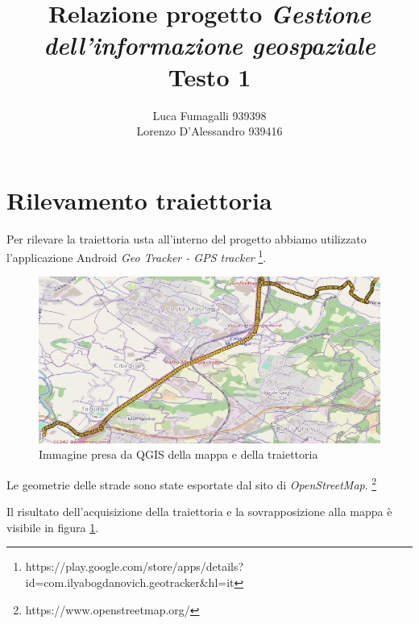 \documentclass[12pt]{report}
\begin{document}
	\author{Luca Fumagalli 939398\\ Lorenzo D'Alessandro 939416}
	\title{Relazione progetto \textit{Gestione dell’informazione geospaziale}\\Testo 1 }
	\date{\vspace{-5ex}}
	\maketitle

\chapter*{Rilevamento traiettoria}
Per rilevare la traiettoria usta all'interno del progetto abbiamo utilizzato l'applicazione Android \textit{Geo Tracker - GPS tracker}%
\footnote{https://play.google.com/store/apps/details?id=com.ilyabogdanovich.geotracker\&hl=it}.
\begin{figure}
	\centering
	\includegraphics[scale = 0.43]{figures/punto1}
	\caption{Immagine presa da QGIS della mappa e della traiettoria}\label{punto1}
\end{figure}
Le geometrie delle strade sono state esportate dal sito di \textit{OpenStreetMap}.%
\footnote{https://www.openstreetmap.org/}

Il risultato dell'acquisizione della traiettoria e la sovrapposizione alla mappa è visibile in figura \ref{punto1}.
\end{document}
